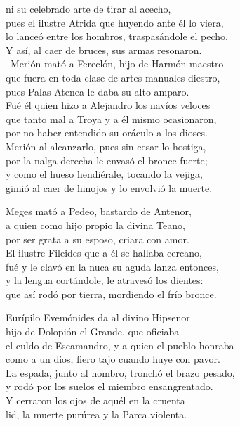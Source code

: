ni su celebrado arte de tirar al acecho,\\
pues el ilustre Atrida que huyendo ante él lo viera,\\
lo lanceó entre los hombros, traspasándole el pecho.\\
Y así, al caer de bruces, sus armas resonaron.\\
--Merión mató a Fereclón, hijo de Harmón maestro\\
que fuera en toda clase de artes manuales diestro,\\
pues Palas Atenea le daba su alto amparo.\\
Fué él quien hizo a Alejandro los navíos veloces\\
que tanto mal a Troya y a él mismo ocasionaron,\\
por no haber entendido su oráculo a los dioses.\\
Merión al alcanzarlo, pues sin cesar lo hostiga,\\
por la nalga derecha le envasó el bronce fuerte;\\
y como el hueso hendiérale, tocando la vejiga,\\
gimió al caer de hinojos y lo envolvió la muerte.\par
Meges mató a Pedeo, bastardo de Antenor,\\
a quien como hijo propio la divina Teano,\\
por ser grata a su esposo, criara con amor.\\
El ilustre Fileides que a él se hallaba cercano,\\
fué y le clavó en la nuca su aguda lanza entonces,\\
y la lengua cortándole, le atravesó los dientes:\\
que así rodó por tierra, mordiendo el frío bronce.\par
Eurípilo Evemónides da al divino Hipsenor\\
hijo de Dolopión el Grande, que oficiaba\\
el culdo de Escamandro, y a quien el pueblo honraba\\
como a un dios, fiero tajo cuando huye con pavor.\\
La espada, junto al hombro, tronchó el brazo pesado,\\
y rodó por los suelos el miembro ensangrentado.\\
Y cerraron los ojos de aquél en la cruenta\\
lid, la muerte purúrea y la Parca violenta.\par
